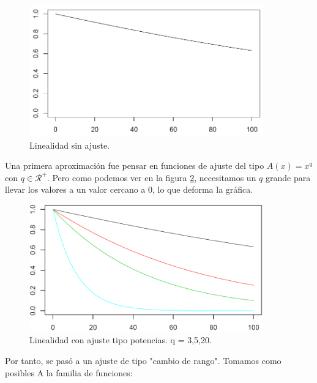 \begin{figure}[H]
\begin{center}

\includegraphics[width=0.9\textwidth]{img/linea-curva.png}
\end{center}

\caption{Linealidad sin ajuste.}
\label{fig2}
\end{figure}

Una primera aproximación fue pensar en funciones de ajuste del tipo $A(x) = x^q$ con $q \in \mathcal{R}^+$. Pero como podemos ver en la figura \ref{fig3}, necesitamos un $q$ grande para llevar los valores a un valor cercano a 0, lo que deforma la gráfica.\\

\begin{figure}[H]
\begin{center}

\includegraphics[width=0.9\textwidth]{img/Ajuste-q.png}
\end{center}

\caption{Linealidad con ajuste tipo potencias. q = 3,5,20.}
\label{fig3}
\end{figure}

Por tanto, se pasó a un ajuste de tipo "cambio de rango". Tomamos como posibles A la familia de funciones:\\


